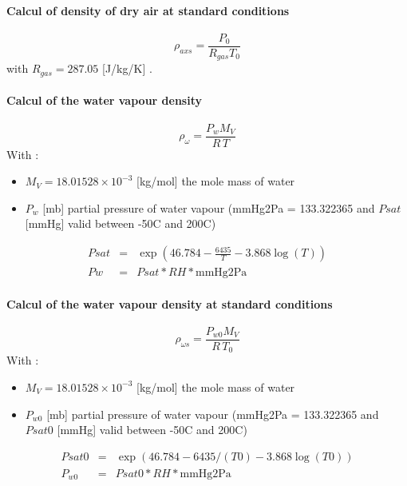 \paragraph*{Calcul of density of dry air at standard conditions}
\begin{equation}
	\rho_{axs} = \frac{P_0}{R_{gas}T_0}\label{subsubsec:rho_axs}
\end{equation}
with $R_{gas} = 287.05$ [J/kg/K] \cite{airDensityBrisbane}.

\paragraph*{Calcul of the water vapour density}
\begin{equation}
	\rho_\omega = \frac{P_wM_V}{R\,T}\label{subsubsec:rho_w}
\end{equation}
With :
\begin{itemize}
	\item $M_V = 18.01528\times 10^{-3}$ [kg/mol] the mole mass of water
	\item $P_w$ [mb] partial pressure of water vapour (mmHg2Pa = 133.322365 and $Psat$ [mmHg] valid between  -50\degree C and 200\degree C)
\end{itemize}

\begin{eqnarray}
	Psat &= &\exp\left(46.784-\frac{6435}{T}-3.868\log(T)\right)\nonumber\\
	Pw &= &Psat*RH*\text{mmHg2Pa}\nonumber
\end{eqnarray}	

\paragraph*{Calcul of the water vapour density at standard conditions}
\begin{equation}
	\rho_{\omega s} = \frac{P_{w0}M_V}{R\,T_0}\label{subsubsec:rho_ws}
\end{equation}
With :
\begin{itemize}
	\item $M_V = 18.01528\times 10^{-3}$ [kg/mol] the mole mass of water
	\item $P_{w0}$ [mb] partial pressure of water vapour (mmHg2Pa = 133.322365 and $Psat0$ [mmHg] valid between  -50\degree C and 200\degree C)
\end{itemize}

\begin{eqnarray}
	Psat0 &= &\exp\left(46.784-6435/(T0)-3.868\log(T0)\right)\nonumber\\
	P_{w0} &= &Psat0*RH*\text{mmHg2Pa}\nonumber
\end{eqnarray}	


